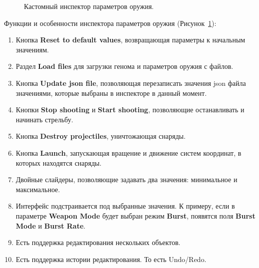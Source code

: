 \begin{figure}[ht]
    \begin{center}

        \caption{
            \label{Inspector}
            Кастомный инспектор параметров оружия.}
    \end {center}
\end {figure}

{\parindent0pt Функции и особенности инспектора параметров оружия (Рисунок~\ref{Inspector}):}
\begin{enumerate}[label=\textbullet]
    \item Кнопка {\small \textbf{Reset to default values}}, возвращающая параметры к начальным значениям.
    \item Раздел {\small \textbf{Load files}} для загрузки генома и параметров оружия с файлов.
    \item Кнопка {\small \textbf{Update json file}}, позволяющая перезаписать значения json файла значениями, которые выбраны в инспекторе в данный момент.
    \item Кнопки {\small \textbf{Stop shooting}} и {\small \textbf{Start shooting}}, позволяющие останавливать и начинать стрельбу. 
    \item Кнопка {\small \textbf{Destroy projectiles}}, уничтожающая снаряды.
    \item Кнопка {\small \textbf{Launch}}, запускающая вращение и движение систем координат, в которых находятся снаряды.
    \item Двойные слайдеры, позволяющие задавать два значения: минимальное и максимальное.
    \item Интерфейс подстраивается под выбранные значения. К примеру, если в параметре {\small \textbf{Weapon Mode}} будет выбран режим {\small \textbf{Burst}}, появятся поля {\small \textbf{Burst Mode}} и {\small \textbf{Burst Rate}}.
    \item Есть поддержка редактирования нескольких объектов.
    \item Есть поддержка истории редактирования. То есть Undo/Redo.
\end{enumerate}


